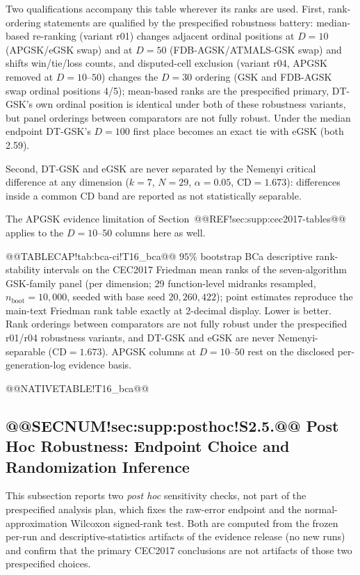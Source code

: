 \documentclass[10pt,a4paper]{article}
\newcommand{\dtgsk}{DT-GSK}
\newcommand{\atmals}{ATMALS-GSK}
\newcommand{\apgsk}{APGSK}
\newcommand{\fdbagsk}{FDB-AGSK}
\newcommand{\egsk}{eGSK}
\begin{document}
Two qualifications accompany this table wherever its ranks are used.
First, rank-ordering statements are qualified by the prespecified
robustness battery: median-based re-ranking (variant r01) changes
adjacent ordinal positions at $D = 10$ (\apgsk{}/\egsk{} swap) and at
$D = 50$ (\fdbagsk{}/\atmals{} swap) and shifts win/tie/loss counts,
and disputed-cell exclusion (variant r04, \apgsk{} removed at
$D = 10$--$50$) changes the $D = 30$ ordering (GSK and \fdbagsk{} swap
ordinal positions 4/5); mean-based ranks are the prespecified
primary, \dtgsk{}'s own ordinal position is identical under both of these
robustness variants, but panel orderings between comparators are not fully robust.
Under the median endpoint \dtgsk{}'s $D = 100$ first place becomes an
exact tie with \egsk{} (both 2.59).

Second, \dtgsk{} and \egsk{} are never separated by the Nemenyi
critical difference at any dimension ($k = 7$, $N = 29$,
$\alpha = 0.05$, $\mathrm{CD} = 1.673$): differences inside a common CD
band are reported as not statistically
separable.

The \apgsk{} evidence limitation of Section~@@REF!sec:supp:cec2017-tables@@
applies to the $D = 10$--$50$ columns here as well.




@@TABLECAP!tab:bca-ci!T16\_bca@@ $95\%$ bootstrap BCa descriptive rank-stability intervals on the CEC2017
Friedman mean ranks of the seven-algorithm GSK-family panel (per dimension;
29 function-level midranks resampled, $n_{\text{boot}} = 10{,}000$,
seeded with base seed $20{,}260{,}422$); point estimates reproduce the
main-text Friedman rank table exactly at 2-decimal display.  Lower is
better.  Rank orderings between comparators are not fully robust under
the prespecified r01/r04 robustness variants, and \dtgsk{} and
\egsk{} are never Nemenyi-separable ($\mathrm{CD} = 1.673$).  \apgsk{}
columns at $D = 10$--$50$ rest on the disclosed per-generation-log
evidence basis.

@@NATIVETABLE!T16\_bca@@



\subsection{@@SECNUM!sec:supp:posthoc!S2.5.@@ Post Hoc Robustness: Endpoint Choice and Randomization Inference}\label{sec:supp:posthoc}

This subsection reports two \emph{post hoc} sensitivity checks, not part of
the prespecified analysis plan, which fixes the raw-error endpoint and the
normal-approximation Wilcoxon signed-rank test.  Both are computed from the
frozen per-run and descriptive-statistics artifacts of the evidence release (no
new runs) and confirm that the primary CEC2017 conclusions are not artifacts of
those two prespecified choices.
\end{document}
